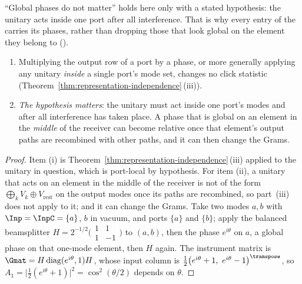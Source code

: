 
``Global phases do not matter'' holds here only with a stated hypothesis:
the unitary acts inside one port after all interference. That is why every
entry of the  carries its phases, rather than dropping
those that look global on the element they belong to
().

\begin{corollary}
\label{cor:phases}
\begin{enumerate}[label=(\roman*),leftmargin=3.0em]
\item Multiplying the output row of a port by a phase, or more generally
  applying any unitary \emph{inside} a single port's mode set, changes no
  click statistic (Theorem~\ref{thm:representation-independence}\,(iii)).
\item \emph{The hypothesis matters}: the unitary must act inside one port's
  modes and after all interference has taken place. A phase that is global
  on an element in the \emph{middle} of the receiver can become relative once
  that element's output paths are recombined with other paths, and it can
  then change the Grams.
\end{enumerate}
\end{corollary}

\begin{proof}
Item (i) is Theorem~\ref{thm:representation-independence}\,(iii) applied to the unitary in question,
which is port-local by hypothesis. For item (ii), a unitary that acts on an
element in the middle of the receiver is not of the form
$\bigoplus_kV_k\oplus V_{\mathrm{rest}}$ on the output modes once its paths
are recombined, so part~(iii) does not apply to it; and it can change the
Grams. Take two modes $a,b$ with $\Inp=\InpC=\{a\}$, $b$ in vacuum, and
ports $\{a\}$ and $\{b\}$; apply the balanced beamsplitter
$H=2^{-1/2}\big(\begin{smallmatrix}1&1\\1&-1\end{smallmatrix}\big)$ to
$(a,b)$, then the phase $e^{i\theta}$ on $a$, a global phase on that
one-mode element, then $H$ again. The instrument matrix is
$\Gmat=H\operatorname{diag}(e^{i\theta},1)H$, whose input column is
$\tfrac12\big(e^{i\theta}+1,\ e^{i\theta}-1\big)^{\transpose}$, so
$A_1=\big|\tfrac12(e^{i\theta}+1)\big|^2=\cos^2(\theta/2)$ depends on
$\theta$.
\end{proof}
